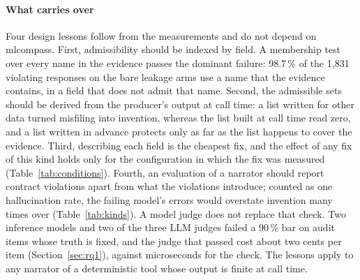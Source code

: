 \documentclass[journal]{IEEEtran}
\begin{document}
\paragraph{What carries over}
Four design lessons follow from the measurements and do not depend on
mlcompass. First, admissibility should be indexed by field. A membership test
over every name in the evidence passes the dominant failure: 98.7\,\% of the
1{,}831 violating responses on the bare leakage arms use a name that the evidence
contains, in a field that does not admit that name. Second, the admissible
sets should be derived from the producer's output at call time: a list written
for other data turned misfiling into invention, whereas the list built at call
time read zero, and a list written in advance protects only as far as the list
happens to cover the evidence. Third, describing each field is the cheapest fix, and the
effect of any fix of this kind holds only for the configuration in which the fix was measured (Table~\ref{tab:conditions}). Fourth, an evaluation of a narrator
should report contract violations apart from what the violations introduce;
counted as one hallucination rate, the failing model's errors would overstate
invention many times over (Table~\ref{tab:kinds}). A model judge does not
replace that check. Two inference models and two of the three LLM judges failed
a 90\,\% bar on audit items whose truth is fixed, and the judge that passed
cost about two cents per item (Section~\ref{sec:rq1}), against microseconds for
the check. The
lessons apply to any narrator of a deterministic tool whose output is finite at
call time.
\end{document}
